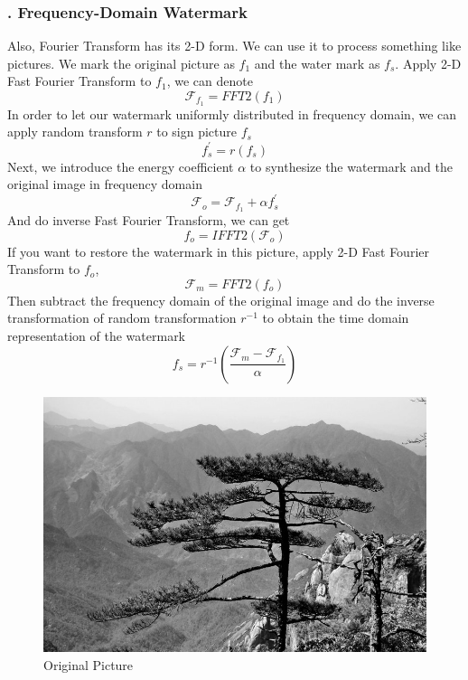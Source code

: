 \documentclass[margin,line]{res}
\begin{document}
\begin{resume}
\subsubsection{. Frequency-Domain Watermark}
Also, Fourier Transform has its 2-D form. We can use it to process something like pictures. We mark the original picture as $f_1$ and the water mark as $f_s$. Apply 2-D Fast Fourier Transform to $f_1$, we can denote
$$
\mathscr{F}_{f_1} = \mathit{FFT2}(f_1)
$$
In order to let our watermark uniformly distributed in frequency domain, we can apply random transform $r$ to sign picture $f_s$
$$
f_s^{'} = r(f_s)
$$
Next, we introduce the energy coefficient $\alpha$ to synthesize the watermark and the original image in frequency domain
$$
\mathscr{F}_{o} = \mathscr{F}_{f_1} + \alpha f_s^{'}
$$
And do inverse Fast Fourier Transform, we can get
$$
f_o = \mathit{IFFT2}(\mathscr{F}_{o})
$$
If you want to restore the watermark in this picture, apply 2-D Fast Fourier Transform to $f_o$, 
$$
\mathscr{F}_m = \mathit{FFT2}(f_o)
$$
Then subtract the frequency domain of the original image and do the inverse transformation of random transformation $r^{-1}$ to obtain the time domain representation of the watermark
$$
f_s = r^{-1} (\frac{\mathscr{F}_m - \mathscr{F}_{f_1}}{\alpha})
$$
\begin{figure}[H]
	\begin{minipage}{0.5\linewidth}
		\includegraphics[width=\linewidth]{figure/watermark/origin.png}
		\caption*{Original Picture}
	\end{minipage}
	\begin{minipage}{0.5\linewidth}

\end{minipage}
\end{figure}
\end{resume}
\end{document}
